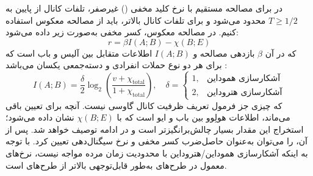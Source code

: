 در  برای مصالحه مستقیم با نرخ کلید مخفی () غیرصفر، تلفات کانال از پایین به $T \geq 1/2$ محدود می‌شود \cite{2,8} و برای تلفات کانال بالاتر، باید از مصالحه معکوس استفاده کنیم. در مصالحه معکوس، کسر مخفی به‌صورت زیر داده می‌شود:
\begin{equation}
	r = \beta I(A; B) - \chi(B; E)
	\label{eq:6-105}
\end{equation}
که در آن $\beta$ بازدهی مصالحه و $I(A; B)$ اطلاعات متقابل بین آلیس و باب است که برای هر دو نوع حملات انفرادی و دسته‌جمعی یکسان می‌باشد \cite{2,8}:
\begin{equation}
	I(A; B) = \frac{\delta}{2} \log_2 \left( \frac{v + \chi_{\text{total}}}{1 + \chi_{\text{total}}} \right), \quad \delta = 
	\begin{cases} 
		1, & \text{آشکارسازی هموداین} \\ 
		2, & \text{آشکارسازی هتروداین} 
	\end{cases}
	\label{eq:6-106}
\end{equation}
که چیزی جز فرمول تعریف ظرفیت کانال گاوسی نیست. آنچه برای تعیین باقی می‌ماند، اطلاعات هولِوو بین باب و ایو است که با $\chi(B; E)$ نشان داده می‌شود؛ استخراج این مقدار بسیار چالش‌برانگیزتر است و در ادامه توصیف خواهد شد. پس از آن،  را می‌توان به‌عنوان حاصل‌ضرب کسر مخفی و نرخ سیگنال‌دهی تعیین کرد. با توجه به اینکه آشکارسازی هموداین/هتروداین با محدودیت زمان مرده مواجه نیست، نرخ‌های  معمول در طرح‌های  به‌طور قابل‌توجهی بالاتر از طرح‌های  است.

